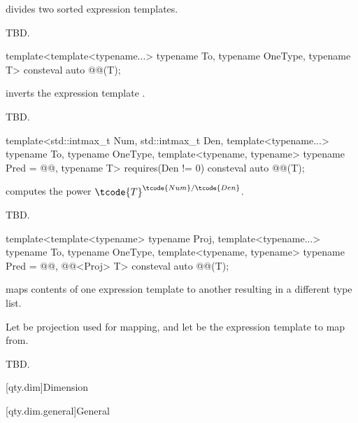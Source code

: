 \begin{itemdescr}
\pnum
{} divides two sorted expression templates.

\pnum
\returns
TBD.
\end{itemdescr}

\begin{itemdecl}
template<template<typename...> typename To, typename OneType, typename T>
consteval auto @@(T);
\end{itemdecl}

\begin{itemdescr}
\pnum
{} inverts the expression template .

\pnum
\returns
TBD.
\end{itemdescr}

\begin{itemdecl}
template<std::intmax_t Num, std::intmax_t Den, template<typename...> typename To,
         typename OneType, template<typename, typename> typename Pred = @@, typename T>
  requires(Den != 0)
consteval auto @@(T);
\end{itemdecl}

\begin{itemdescr}
\pnum
{} computes the power $\tcode{T}^{\tcode{Num}/\tcode{Den}}$.

\pnum
\returns
TBD.
\end{itemdescr}

\begin{itemdecl}
template<template<typename> typename Proj, template<typename...> typename To, typename OneType,
         template<typename, typename> typename Pred = @@, @@<Proj> T>
consteval auto @@(T);
\end{itemdecl}

\begin{itemdescr}
\pnum
{} maps contents of one expression template to another resulting in a different type list.

\pnum
Let  be projection used for mapping, and
let  be the expression template to map from.

\pnum
\returns
TBD.
\end{itemdescr}

[qty.dim]{Dimension}

[qty.dim.general]{General}

